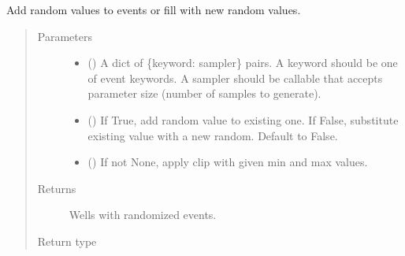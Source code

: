 \documentclass[letterpaper,10pt,english]{sphinxmanual}
\begin{document}
\begin{fulllineitems}
\begin{fulllineitems}
\label{\detokenize{api/wells:geology.src.wells.Wells.randomize_events}}
Add random values to events or fill with new random values.
\begin{quote}\begin{description}
\item[{Parameters}] \leavevmode\begin{itemize}
\item {} 
 () \textendash{} A dict of \{keyword: sampler\} pairs. A keyword should be one
of event keywords. A sampler should be callable that accepts parameter size
(number of samples to generate).

\item {} 
 () \textendash{} If True, add random value to existing one. If False, substitute existing value
with a new random. Default to False.

\item {} 
 (\sphinxstyleliteralemphasis{\sphinxupquote{(}}\sphinxstyleliteralemphasis{\sphinxupquote{, }}\sphinxstyleliteralemphasis{\sphinxupquote{)}}\sphinxstyleliteralemphasis{\sphinxupquote{, }}) \textendash{} If not None, apply clip with given min and max values.

\end{itemize}

\item[{Returns}] \leavevmode
{} \textendash{} Wells with randomized events.

\item[{Return type}] \leavevmode
{\hyperref[\detokenize{api/wells:geology.src.wells.Wells}]{}}

\end{description}\end{quote}


\end{fulllineitems}
\end{fulllineitems}
\end{document}
